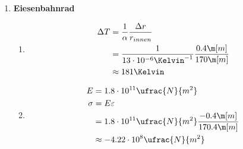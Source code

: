 \documentclass[11pt,letterpaper]{article}
\begin{document}
\begin{enumerate}
    
    \item \textbf{Eiesenbahnrad}
    \begin{enumerate}
        \item 
            \begin{align*}
                \Delta T &= \frac{1}{\alpha} \frac{\Delta r}{r_{innen}}\\
                &= \frac{1}{13\cdot 10^{-6}\Kelvin^{-1}}\frac{0.4\m[m]}{170\m[m]}\\
                &\approx 181 \Kelvin
            \end{align*}
        \item 
            \begin{align*}
                E &=  1.8 \cdot 10^{11} \ufrac{N}{m^2} \\
                \sigma &= E \varepsilon\\
                &= 1.8 \cdot 10^{11} \ufrac{N}{m^2}\frac{-0.4\m[m]}{170.4\m[m]}\\
                &\approx -4.22\cdot 10^{8} \ufrac{N}{m^2}\\
            \end{align*}
    \end{enumerate}


\end{enumerate}
\end{document}
